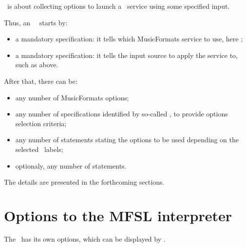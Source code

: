 \mfslLang\ is about collecting options to launch a \mf\ service using some specified input.

Thus, an \mfslLang\ \script\ starts by:
\begin{itemize}
\item a mandatory  specification: it tells which MusicFormats service
    to use, here \xmlToLy;

\item  a mandatory   specification: it tells the input source to apply
    the service to, such as  above.
\end{itemize}

After that, there can be:
\begin{itemize}
\item  any number of MusicFormats options;

\item  any number of   specifications identified by so-called , to provide options selection criteria;

\item any number of   statements stating the options to be used depending on
  the selected \choice\ labels;

\item optionaly, any number of  statements.

\end{itemize}

The details are presented in the forthcoming sections.


\section{Options to the MFSL interpreter}

The \mfslInterp\ has its own options, which can be displayed by .

